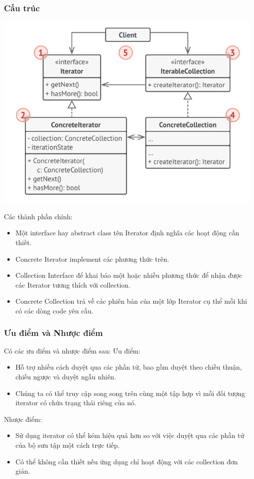 \subsubsection{Cấu trúc}
\begin{center}
    \includegraphics[scale= 0.6]{image/behavioral/iterator.png}
\end{center}
Các thành phần chính:
\begin{itemize}
    \item Một interface hay abstract class tên Iterator định nghĩa các hoạt động cần thiết.
    \item Concrete Iterator implement các phương thức trên.
    \item Collection Interface để khai báo một hoặc nhiều phương thức để nhận được các Iterator tương thích với collection.
    \item Concrete Collection trả về các phiên bản của một lớp Iterator cụ thể mỗi khi có các dòng code yêu cầu.
\end{itemize}
\subsubsection{Ưu điểm và Nhược điểm}
Có các ưu điểm và nhược điểm sau:
Ưu điểm:
\begin{itemize}
    \item Hỗ trợ nhiều cách duyệt qua các phần tử, bao gồm duyệt theo chiều thuận, chiều ngược và duyệt ngẫu nhiên.
    \item Chúng ta có thể truy cập song song trên cùng một tập hợp vì mỗi đối tượng iterator có chứa trạng thái riêng của nó.
\end{itemize}
Nhược điểm:
\begin{itemize}
    \item Sử dụng iterator có thể kém hiệu quả hơn so với việc duyệt qua các phần tử của bộ sưu tập một cách trực tiếp.
    \item Có thể không cần thiết nếu ứng dụng chỉ hoạt động với các collection đơn giản.
\end{itemize}
